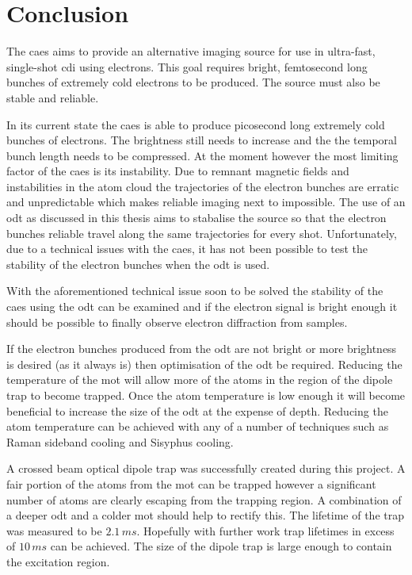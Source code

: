 \chapter{Conclusion}

The \gls{caes} aims to provide an alternative imaging source for use in ultra-fast, single-shot \gls{cdi} using electrons. This goal requires bright, femtosecond long bunches of extremely cold electrons to be produced. The source must also be stable and reliable.

In its current state the \gls{caes} is able to produce picosecond long extremely cold bunches of electrons. The brightness still needs to increase and the the temporal bunch length needs to be compressed. At the moment however the most limiting factor of the \gls{caes} is its instability. Due to remnant magnetic fields and instabilities in the atom cloud the trajectories of the electron bunches are erratic and unpredictable which makes reliable imaging next to impossible. The use of an \gls{odt} as discussed in this thesis aims to stabalise the source so that the electron bunches reliable travel along the same trajectories for every shot. Unfortunately, due to a technical issues with the \gls{caes}, it has not been possible to test the stability of the electron bunches when the \gls{odt} is used.

With the aforementioned technical issue soon to be solved the stability of the \gls{caes} using the \gls{odt} can be examined and if the electron signal is bright enough it should be possible to finally observe electron diffraction from samples.

If the electron bunches produced from the \gls{odt} are not bright or more brightness is desired (as it always is) then optimisation of the \gls{odt} be required. Reducing the temperature of the \gls{mot} will allow more of the atoms in the region of the dipole trap to become trapped. Once the atom temperature is low enough it will become beneficial to increase the size of the \gls{odt} at the expense of depth. Reducing the atom temperature can be achieved with any of a number of techniques such as Raman sideband cooling\cite{metcalf_laser_1999} and Sisyphus cooling\cite{metcalf_laser_1999}.


A crossed beam optical dipole trap was successfully created during this project. A fair portion of the atoms from the \gls{mot} can be trapped however a significant number of atoms are clearly escaping from the trapping region. A combination of a deeper \gls{odt} and a colder \gls{mot} should help to rectify this. The lifetime of the trap was measured to be $2.1\,\unit{ms}$. Hopefully with further work trap lifetimes in excess of $10\,\unit{ms}$ can be achieved. The size of the dipole trap is large enough to contain the excitation region.

